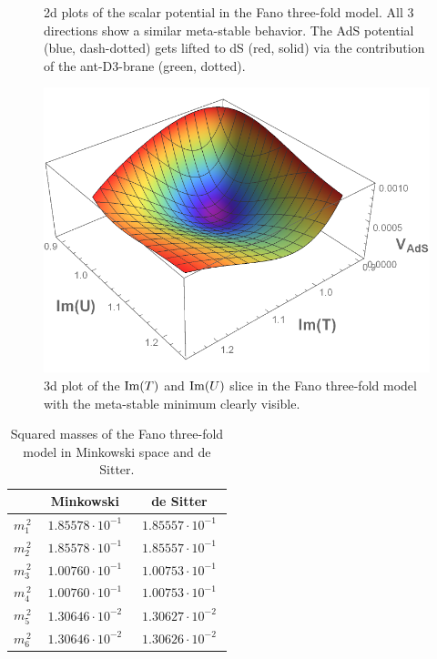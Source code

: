 \documentclass[a4paper,12pt,twoside,openright]{report}
\def\rmim{{\rm Im}}
\begin{document}
\begin{figure}[H]
\caption{2d plots of the scalar potential in the Fano three-fold model. All 3 directions show a similar meta-stable behavior. The AdS potential (blue, dash-dotted) gets lifted to dS (red, solid) via the contribution of the ant-D3-brane (green, dotted).}
\label{fig:swiss2d}
\end{figure}

\begin{figure}[H]
\centering
\includegraphics[scale=0.78]{quevedo_38_3D_large.pdf}
\caption{3d plot of the $\rmim(T)$ and $\rmim(U)$ slice in the Fano three-fold model with the meta-stable minimum clearly visible.}
\label{fig:swiss3d}
\end{figure}

\begin{table}[htb]
\centering
\begin{tabular}{|c|c|c|}\hline
&  Minkowski  & de Sitter \\\hline
$m_1^{\,2}$ & $\; 1.85578 \cdot 10^{-1} \;$ & $\; 1.85557 \cdot 10^{-1} \;$\\\hline
$m_2^{\,2}$ & $\; 1.85578 \cdot 10^{-1} \;$ & $\; 1.85557 \cdot 10^{-1} \;$\\\hline
$m_3^{\,2}$ & $\; 1.00760 \cdot 10^{-1} \;$ & $\; 1.00753 \cdot 10^{-1} \;$\\\hline
$m_4^{\,2}$ & $\; 1.00760 \cdot 10^{-1} \;$ & $\; 1.00753 \cdot 10^{-1} \;$\\\hline
$m_5^{\,2}$ & $\; 1.30646 \cdot 10^{-2} \;$ & $\; 1.30627 \cdot 10^{-2} \;$\\\hline
$m_6^{\,2}$ & $\; 1.30646 \cdot 10^{-2} \;$ & $\; 1.30626 \cdot 10^{-2} \;$\\\hline
\end{tabular}
\caption{Squared masses of the Fano three-fold model in Minkowski space and de Sitter.}
\label{tab:swissmass}
\end{table}
\end{document}
